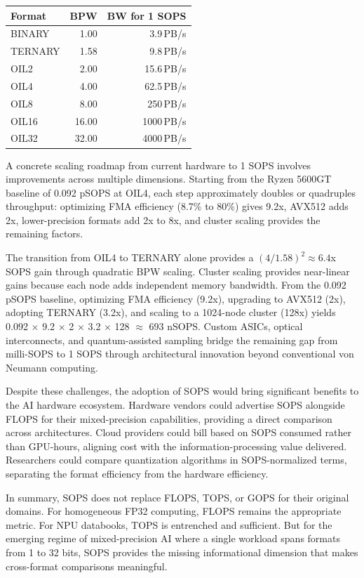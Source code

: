 \begin{center}
\tablestyle
\begin{tabular}{lrr}
\toprule
\textbf{Format} & \textbf{BPW} & \textbf{BW for 1 SOPS} \\
\midrule
BINARY & 1.00 & 3.9\,PB/s \\
TERNARY & 1.58 & 9.8\,PB/s \\
OIL2 & 2.00 & 15.6\,PB/s \\
OIL4 & 4.00 & 62.5\,PB/s \\
OIL8 & 8.00 & 250\,PB/s \\
OIL16 & 16.00 & 1000\,PB/s \\
OIL32 & 32.00 & 4000\,PB/s \\
\bottomrule
\end{tabular}
\end{center}

A concrete scaling roadmap from current hardware to 1 SOPS involves improvements across multiple dimensions. Starting from the Ryzen 5600GT baseline of 0.092 pSOPS at OIL4, each step approximately doubles or quadruples throughput: optimizing FMA efficiency (8.7\% to 80\%) gives 9.2x, AVX512 adds 2x, lower-precision formats add 2x to 8x, and cluster scaling provides the remaining factors.

The transition from OIL4 to TERNARY alone provides a $(4 / 1.58)^2 \approx 6.4$x SOPS gain through quadratic BPW scaling. Cluster scaling provides near-linear gains because each node adds independent memory bandwidth. From the 0.092 pSOPS baseline, optimizing FMA efficiency (9.2x), upgrading to AVX512 (2x), adopting TERNARY (3.2x), and scaling to a 1024-node cluster (128x) yields 0.092 $\times$ 9.2 $\times$ 2 $\times$ 3.2 $\times$ 128 $\approx$ 693 nSOPS. Custom ASICs, optical interconnects, and quantum-assisted sampling bridge the remaining gap from milli-SOPS to 1 SOPS through architectural innovation beyond conventional von Neumann computing.

Despite these challenges, the adoption of SOPS would bring significant benefits to the AI hardware ecosystem. Hardware vendors could advertise SOPS alongside FLOPS for their mixed-precision capabilities, providing a direct comparison across architectures. Cloud providers could bill based on SOPS consumed rather than GPU-hours, aligning cost with the information-processing value delivered. Researchers could compare quantization algorithms in SOPS-normalized terms, separating the format efficiency from the hardware efficiency.

In summary, SOPS does not replace FLOPS, TOPS, or GOPS for their original domains. For homogeneous FP32 computing, FLOPS remains the appropriate metric. For NPU databooks, TOPS is entrenched and sufficient. But for the emerging regime of mixed-precision AI where a single workload spans formats from 1 to 32 bits, SOPS provides the missing informational dimension that makes cross-format comparisons meaningful.
